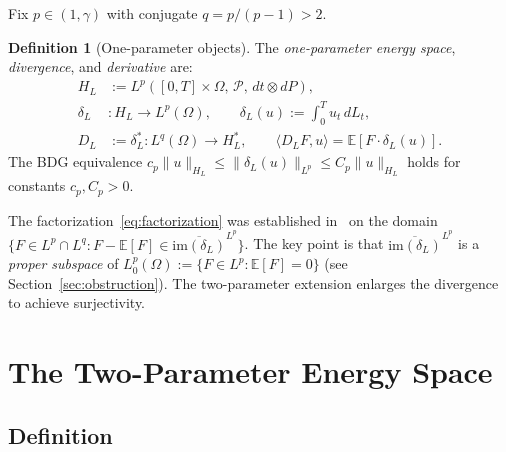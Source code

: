 \documentclass[11pt,a4paper]{article}
\theoremstyle{plain}
\theoremstyle{definition}
\newtheorem{definition}[theorem]{Definition}
\theoremstyle{remark}
\newcommand{\E}{\mathbb{E}}
\newcommand{\im}{\mathrm{im}}
\begin{document}
Fix $p \in (1,\gamma)$ with conjugate $q = p/(p-1) > 2$.

\begin{definition}[One-parameter objects]\label{def:one-param}
The \emph{one-parameter energy space}, \emph{divergence},
and \emph{derivative} are:
\begin{align}
  H_L &:= L^p([0,T]\times\Omega,\,\mathcal{P},\,
  dt\otimes dP), \label{eq:HL}\\
  \delta_L &: H_L \to L^p(\Omega), \qquad
  \delta_L(u) := \int_0^T u_t\,dL_t, \label{eq:deltaL}\\
  D_L &:= \delta_L^* : L^q(\Omega) \to H_L^*, \qquad
  \langle D_L F, u \rangle = \E[F\cdot\delta_L(u)].
  \label{eq:DL}
\end{align}
The BDG equivalence
$c_p\|u\|_{H_L} \leq \|\delta_L(u)\|_{L^p}
\leq C_p\|u\|_{H_L}$ holds for constants
$c_p, C_p > 0$.
\end{definition}

The factorization~\eqref{eq:factorization} was established
in~\cite{Fontes2026d} on the domain
$\{F \in L^p \cap L^q : F - \E[F] \in
\overline{\im(\delta_L)}^{L^p}\}$.
The key point is that $\overline{\im(\delta_L)}^{L^p}$
is a \emph{proper subspace} of $L^p_0(\Omega) :=
\{F \in L^p : \E[F] = 0\}$ (see
Section~\ref{sec:obstruction}).  The two-parameter extension
enlarges the divergence to achieve surjectivity.


\section{The Two-Parameter Energy Space}\label{sec:two-param}

\subsection{Definition}
\end{document}
